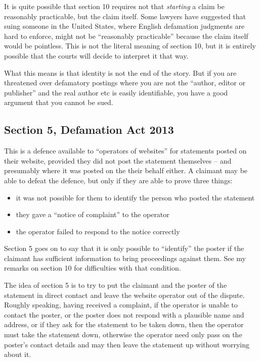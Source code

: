 \documentclass[]{article}
\begin{document}
It is quite possible that section 10 requires not that {\it starting} a claim be reasonably practicable, but the claim itself. Some lawyers have suggested that suing someone in the United States, where English defamation judgments are hard to enforce, might not be ``reasonably practicable'' because the claim itself would be pointless. This is not the literal meaning of section 10, but it is entirely possible that the courts will decide to interpret it that way.

What this means is that identity is not the end of the story. But if you are threatened over defamatory postings where you are not the ``author, editor or publisher'' and the real author etc is easily identifiable, you have a good argument that you cannot be sued.

\subsection{Section 5, Defamation Act 2013}
This is a defence available to ``operators of websites'' for statements posted on their website, provided they did not post the statement themselves -- and presumably where it was posted on the their behalf either. A claimant may be able to defeat the defence, but only if they are able to prove three things:

\begin{itemize}
\item it was not possible for them to identify the person who posted the statement
\item they gave a ``notice of complaint'' to the operator
\item the operator failed to respond to the notice correctly
\end{itemize}

Section 5 goes on to say that it is only possible to ``identify'' the poster if the claimant has sufficient information to bring proceedings against them. See my remarks on section 10 for difficulties with that condition.

The idea of section 5 is to try to put the claimant and the poster of the statement in direct contact and leave the website operator out of the dispute. Roughly speaking, having received a complaint, if the operator is unable to contact the poster, or the poster does not respond with a plausible name and address, or if they ask for the statement to be taken down, then the operator must take the statement down, otherwise the operator need only pass on the poster's contact details and may then leave the statement up without worrying about it.
\end{document}
